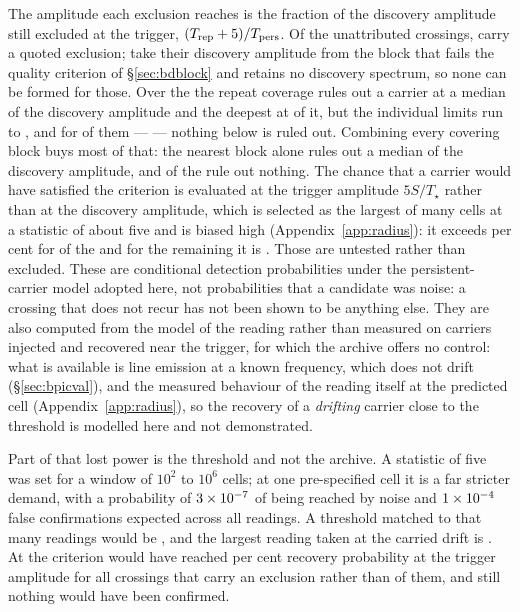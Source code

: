 The amplitude each exclusion reaches is the fraction of the discovery
amplitude still excluded at the trigger, $(T_{\rm rep}+5)/T_{\rm pers}$. Of
the \RcNTested{} unattributed crossings, \RcNExcl{} carry a quoted exclusion;
\RcNWithheld{} take their discovery amplitude from the block that fails the
quality criterion of \S\ref{sec:bdblock} and \RcNNoSpec{} retains no discovery
spectrum, so none can be formed for those. Over the \RcNExcl{} the repeat
coverage rules out a carrier at a median \RcFracMed{} of the discovery
amplitude and the deepest at \RcFracMin{} of it, but the individual limits run
to \RcFracMax, and for \RcNFracWeak{} of them --- \RcFracWeakList{} --- nothing
below \RcFracWeakLo{} is ruled out. Combining every covering block buys most
of that: the nearest block alone rules out a median \TjFracNearMed{} of the
discovery amplitude, and \TjNNearWeak{} of the \RcNExcl{} rule out
nothing. The chance that a carrier would have satisfied the criterion is
evaluated at the trigger amplitude $5S/T_\star$ rather than at the
discovery amplitude, which is selected as the largest of many cells at a
statistic of about five and is biased high (Appendix~\ref{app:radius}): it
exceeds \RcPowerLevel{} per cent for \RqNPowerHi{} of the \RcNExcl{} and for
the remaining \RcNPowerLoTrig{} it is \RqLowList. Those \RcNPowerLoTrig{} are
untested rather than excluded. These are conditional detection probabilities
under the persistent-carrier model adopted here, not probabilities that a
candidate was noise: a crossing that does not recur has not been shown to be
anything else. They are also computed from the model of the reading rather
than measured on carriers injected and recovered near the trigger, for which
the archive offers no control: what is available is line emission at a known
frequency, which does not drift
(\S\ref{sec:bpicval}), and the measured behaviour of the reading itself at
the predicted cell (Appendix~\ref{app:radius}), so the recovery of a
\emph{drifting} carrier close to the threshold is modelled here and not
demonstrated.

Part of that lost power is the threshold and not the archive. A statistic of
five was set for a window of $10^{2}$ to $10^{6}$ cells; at one pre-specified
cell it is a far stricter demand, with a probability of
$3\times10^{-7}$ of being reached by noise and
$1\times10^{-4}$ false confirmations expected across
all \RcNRepeatMeas{} readings. A threshold matched to that many readings would
be \ZtTrialThr, and the largest reading taken at the carried drift is
\RcTMatched. At \ZtTrialThr{} the criterion would have reached
\RcPowerLevel{} per cent recovery probability at the trigger amplitude for
all \ZtNPowerTrial{} crossings that carry an exclusion rather than
\RqNPowerHi{} of them, and still nothing would have been confirmed.

